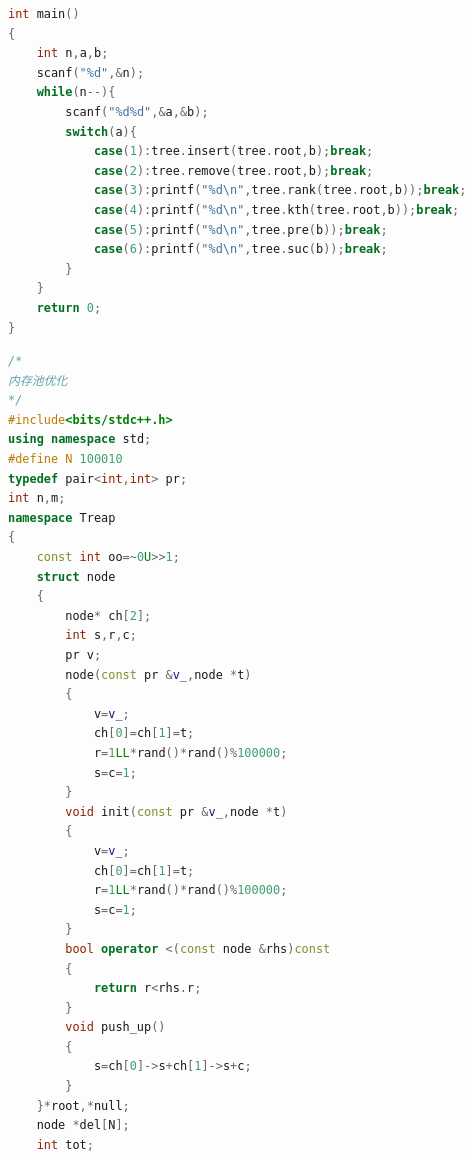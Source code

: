 \documentclass[UTF8,a4paper,titlepage]{ctexart}
\begin{document}
\begin{lstlisting}[language=C++]
int main()
{
    int n,a,b;
    scanf("%d",&n);
    while(n--){
        scanf("%d%d",&a,&b);
        switch(a){
            case(1):tree.insert(tree.root,b);break;
            case(2):tree.remove(tree.root,b);break;
            case(3):printf("%d\n",tree.rank(tree.root,b));break;
            case(4):printf("%d\n",tree.kth(tree.root,b));break;
            case(5):printf("%d\n",tree.pre(b));break;
            case(6):printf("%d\n",tree.suc(b));break;
        }
    }
    return 0;
}
	\end{lstlisting}
    \begin{lstlisting}[language=C++]
/*
内存池优化
*/
#include<bits/stdc++.h>
using namespace std;
#define N 100010
typedef pair<int,int> pr;
int n,m;
namespace Treap
{
    const int oo=~0U>>1;
    struct node
    {
        node* ch[2];
        int s,r,c;
        pr v;
        node(const pr &v_,node *t)
        {
            v=v_;
            ch[0]=ch[1]=t;
            r=1LL*rand()*rand()%100000;
            s=c=1;
        }
        void init(const pr &v_,node *t)
        {
            v=v_;
            ch[0]=ch[1]=t;
            r=1LL*rand()*rand()%100000;
            s=c=1;
        }
        bool operator <(const node &rhs)const
        {
            return r<rhs.r;
        }
        void push_up()
        {
            s=ch[0]->s+ch[1]->s+c;
        }
    }*root,*null;
    node *del[N];
    int tot;


\end{lstlisting}
\end{document}
